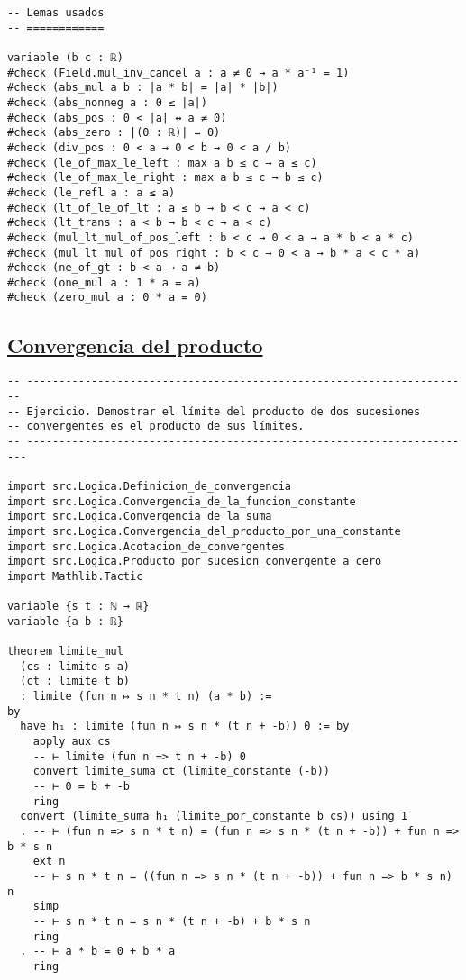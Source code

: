 \begin{verbatim}
-- Lemas usados
-- ============

variable (b c : ℝ)
#check (Field.mul_inv_cancel a : a ≠ 0 → a * a⁻¹ = 1)
#check (abs_mul a b : |a * b| = |a| * |b|)
#check (abs_nonneg a : 0 ≤ |a|)
#check (abs_pos : 0 < |a| ↔ a ≠ 0)
#check (abs_zero : |(0 : ℝ)| = 0)
#check (div_pos : 0 < a → 0 < b → 0 < a / b)
#check (le_of_max_le_left : max a b ≤ c → a ≤ c)
#check (le_of_max_le_right : max a b ≤ c → b ≤ c)
#check (le_refl a : a ≤ a)
#check (lt_of_le_of_lt : a ≤ b → b < c → a < c)
#check (lt_trans : a < b → b < c → a < c)
#check (mul_lt_mul_of_pos_left : b < c → 0 < a → a * b < a * c)
#check (mul_lt_mul_of_pos_right : b < c → 0 < a → b * a < c * a)
#check (ne_of_gt : b < a → a ≠ b)
#check (one_mul a : 1 * a = a)
#check (zero_mul a : 0 * a = 0)
\end{verbatim}

\subsection{\href{./src/Logica/Convergencia\_del\_producto.lean}{Convergencia del producto}}
\label{sec:org6a6d46b}
\begin{verbatim}
-- ---------------------------------------------------------------------
-- Ejercicio. Demostrar el límite del producto de dos sucesiones
-- convergentes es el producto de sus límites.
-- ----------------------------------------------------------------------

import src.Logica.Definicion_de_convergencia
import src.Logica.Convergencia_de_la_funcion_constante
import src.Logica.Convergencia_de_la_suma
import src.Logica.Convergencia_del_producto_por_una_constante
import src.Logica.Acotacion_de_convergentes
import src.Logica.Producto_por_sucesion_convergente_a_cero
import Mathlib.Tactic

variable {s t : ℕ → ℝ}
variable {a b : ℝ}

theorem limite_mul
  (cs : limite s a)
  (ct : limite t b)
  : limite (fun n ↦ s n * t n) (a * b) :=
by
  have h₁ : limite (fun n ↦ s n * (t n + -b)) 0 := by
    apply aux cs
    -- ⊢ limite (fun n => t n + -b) 0
    convert limite_suma ct (limite_constante (-b))
    -- ⊢ 0 = b + -b
    ring
  convert (limite_suma h₁ (limite_por_constante b cs)) using 1
  . -- ⊢ (fun n => s n * t n) = (fun n => s n * (t n + -b)) + fun n => b * s n
    ext n
    -- ⊢ s n * t n = ((fun n => s n * (t n + -b)) + fun n => b * s n) n
    simp
    -- ⊢ s n * t n = s n * (t n + -b) + b * s n
    ring
  . -- ⊢ a * b = 0 + b * a
    ring
\end{verbatim}

